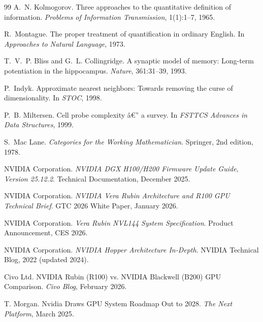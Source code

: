 ﻿\documentclass[12pt,a4paper]{article}
\begin{document}
\begin{thebibliography}{99}
A.~N. Kolmogorov.
\newblock Three approaches to the quantitative definition of information.
\newblock \textit{Problems of Information Transmission}, 1(1):1--7, 1965.

R.~Montague.
\newblock The proper treatment of quantification in ordinary English.
\newblock In \textit{Approaches to Natural Language}, 1973.

T.~V.~P. Bliss and G.~L. Collingridge.
\newblock A synaptic model of memory: Long-term potentiation in the hippocampus.
\newblock \textit{Nature}, 361:31--39, 1993.

P.~Indyk.
\newblock Approximate nearest neighbors: Towards removing the curse of
  dimensionality.
\newblock In \textit{STOC}, 1998.

P.~B. Miltersen.
\newblock Cell probe complexity â€” a survey.
\newblock In \textit{FSTTCS Advances in Data Structures}, 1999.

S.~Mac Lane.
\newblock \textit{Categories for the Working Mathematician}.
\newblock Springer, 2nd edition, 1978.


NVIDIA Corporation.
\newblock \textit{NVIDIA DGX H100/H200 Firmware Update Guide, Version 25.12.2}.
\newblock Technical Documentation, December 2025.

NVIDIA Corporation.
\newblock \textit{NVIDIA Vera Rubin Architecture and R100 GPU Technical Brief}.
\newblock GTC 2026 White Paper, January 2026.

NVIDIA Corporation.
\newblock \textit{Vera Rubin NVL144 System Specification}.
\newblock Product Announcement, CES 2026.

NVIDIA Corporation.
\newblock \textit{NVIDIA Hopper Architecture In-Depth}.
\newblock NVIDIA Technical Blog, 2022 (updated 2024).

Civo Ltd.
\newblock NVIDIA Rubin (R100) vs. NVIDIA Blackwell (B200) GPU Comparison.
\newblock \textit{Civo Blog}, February 2026.

T. Morgan.
\newblock Nvidia Draws GPU System Roadmap Out to 2028.
\newblock \textit{The Next Platform}, March 2025.

\end{thebibliography}
\end{document}
